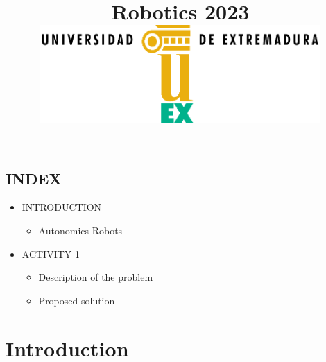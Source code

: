 \documentclass[conference]{IEEEtran}
\begin{document}
\title{Robotics 2023\\
{\vspace{3.0 cm}}
{\includegraphics[width=0.8\textwidth]{image.png}} %
\vspace{3.0cm}}


\author{
\and
{}

\vspace{20.0 cm}
}


\maketitle

\subsection{INDEX}
\begin{itemize}
    \item INTRODUCTION
    \begin{itemize}
        \item Autonomics Robots
        \end{itemize}
    \item ACTIVITY 1
        \begin{itemize}
        \item Description of the problem 
        \item Proposed solution
        \end{itemize}
\end{itemize}



\section{Introduction}
\end{document}
